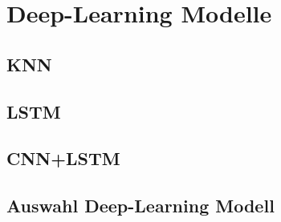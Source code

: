 \section{Deep-Learning Modelle}

\subsection{KNN}






\subsection{LSTM}

\subsection{CNN+LSTM}

\subsection{Auswahl Deep-Learning Modell}